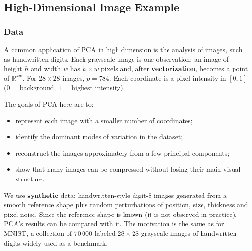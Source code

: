 \subsection{High-Dimensional Image Example}

\subsubsection{Data}

A common application of PCA in high dimension is the analysis of images, such as handwritten digits. Each grayscale image
is one observation: an image of height $h$ and width $w$ has $h \times w$ pixels and, after \textbf{vectorization}, becomes a
point of $\mathbb{R}^{hw}$. For $28 \times 28$ images, $p = 784$. Each coordinate is a pixel intensity in $[0, 1]$
($0$ = background, $1$ = highest intensity).

The goals of PCA here are to:
\begin{itemize}
  \item represent each image with a smaller number of coordinates;
  \item identify the dominant modes of variation in the dataset;
  \item reconstruct the images approximately from a few principal components;
  \item show that many images can be compressed without losing their main visual structure.
\end{itemize}

We use \textbf{synthetic} data: handwritten-style digit-8 images generated from a smooth reference shape plus random
perturbations of position, size, thickness and pixel noise. Since the reference shape is known (it is not observed in
practice), PCA's results can be compared with it. The motivation is the same as for MNIST, a collection of $70\,000$ labeled
$28 \times 28$ grayscale images of handwritten digits widely used as a benchmark.

